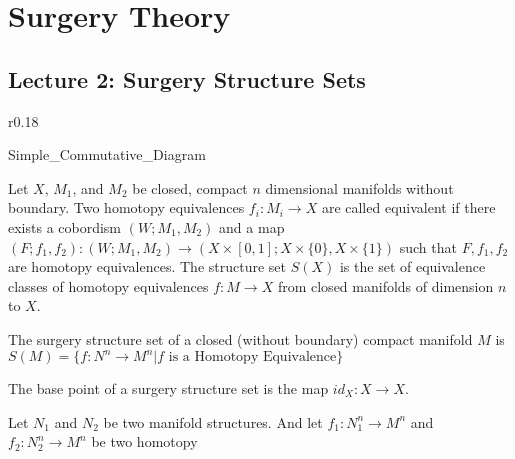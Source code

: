 \documentclass[crop=false,class=article,oneside]{standalone}
\begin{document}
    \ifx\ifmathcoursessurgery\undefined
        \section*{Surgery Theory}
        \setcounter{section}{1}
        \renewcommand\thefigure{%
            \arabic{section}.\arabic{figure}%
        }
        \renewcommand\thesubfigure{%
            \arabic{section}.\arabic{figure}.\arabic{subfigure}%
        }
    \fi
    \subsection{Lecture 2: Surgery Structure Sets}
        \begin{wrapfigure}[8]{r}{0.18\textwidth}
            \centering
            \captionsetup{type=figure}
            \vspace{-2ex}
            
                      {Simple_Commutative_Diagram}
            \caption{An example of a Commutative Diagram.}
            \label{%
                fig:wellesley_surgery_theory_%
                commutative_diagram_for_g_for_%
                two_homotopy_equivalences%
            }
        \end{wrapfigure}
        Let $X$, $M_{1}$, and $M_{2}$ be closed,
        compact $n$ dimensional manifolds without boundary.
        Two homotopy equivalences $f_{i}:M_{i}\rightarrow X$
        are called equivalent if there exists a cobordism
        $(W;M_{1},M_{2})$ and a map
        $(F;f_{1},f_{2}):(W;M_{1},M_{2})%
         \rightarrow(X\times[0,1];X\times\{0\},X\times\{1\})$
        such that $F,f_{1},f_{2}$ are homotopy equivalences.
        The structure set $S(X)$ is the set of equivalence
        classes of homotopy equivalences $f:M\rightarrow X$
        from closed manifolds of dimension $n$ to $X$.
        \hfill
        \begin{definition}
            The surgery structure set of a closed
            (without boundary) compact manifold $M$ is
            $S(M)=\{f:N^{n}\rightarrow{M^{n}}|f%
             \textrm{ is a Homotopy Equivalence}\}$
        \end{definition}
        \begin{definition}
            The base point of a surgery structure
            set is the map $id_{X}:X\rightarrow X$.
        \end{definition}
        Let $N_{1}$ and $N_{2}$ be two manifold structures.
        And let $f_{1}:N_{1}^{n}\rightarrow M^{n}$ and
        $f_{2}:N_{2}^{n}\rightarrow M^{n}$ be two homotopy
\end{document}
